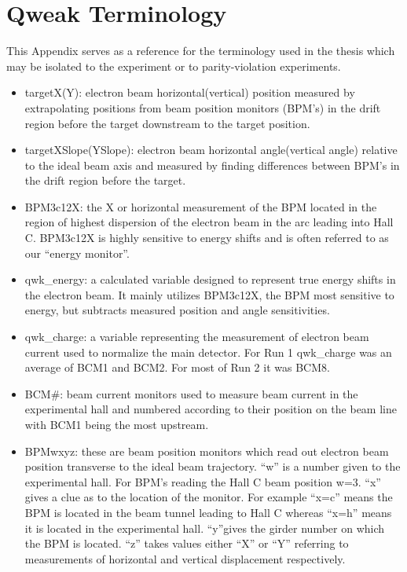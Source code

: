 
\chapter{Qweak Terminology} 
\captionsetup{justification=justified,singlelinecheck=false}

\label{AppendixE} 

This Appendix serves as a reference for the terminology used in the thesis which may be isolated to the \Qs experiment or to parity-violation experiments.

\begin{itemize}
\item {targetX(Y): electron beam horizontal(vertical) position measured by extrapolating positions from beam position monitors (BPM's) in the drift region before the target downstream to the target position.}
\item {targetXSlope(YSlope): electron beam horizontal angle(vertical angle) relative to the ideal beam axis and measured by finding differences between BPM's in the drift region before the target.}
\item{BPM3c12X: the X or horizontal measurement of the BPM located in the region of highest dispersion of the electron beam in the arc leading into Hall C. BPM3c12X is highly sensitive to energy shifts and is often referred to as our ``energy monitor''.}
\item { qwk\_energy: a calculated variable designed to represent true energy shifts in the electron beam. It mainly utilizes BPM3c12X, the BPM most sensitive to energy, but subtracts measured position and angle sensitivities.}
\item{ qwk\_charge: a variable representing the measurement of electron beam current used to normalize the main detector. For Run 1 qwk\_charge was an average of BCM1 and BCM2. For most of Run 2 it was BCM8.}
\item{BCM\#: beam current monitors used to measure beam current in the experimental hall and numbered according to their position on the beam line with BCM1 being the most upstream.}
\item{BPMwxyz: these are beam position monitors which read out electron beam position transverse to the ideal beam trajectory. ``w'' is a number given to the experimental hall. For BPM's reading the Hall C beam position w=3.  ``x'' gives a clue as to the location of the monitor. For example ``x=c'' means the BPM is located in the beam tunnel leading to Hall C whereas ``x=h'' means it is located in the experimental hall. ``y''gives the girder number on which the BPM is located. ``z'' takes values either ``X'' or ``Y'' referring to measurements of horizontal and vertical displacement respectively.}

\end{itemize}
